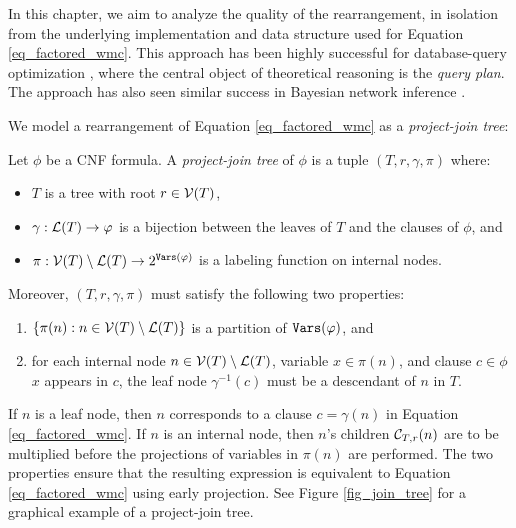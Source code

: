 In this chapter, we aim to analyze the quality of the rearrangement, in isolation from the underlying implementation and data structure used for Equation \eqref{eq_factored_wmc}.
This approach has been highly successful for database-query optimization \cite{MPPV04}, where the central object of theoretical reasoning is the \emph{query plan}.
The approach has also seen similar success in Bayesian network inference \cite{darwiche1998dynamic}.

We model a rearrangement of Equation \eqref{eq_factored_wmc} as a \emph{project-join tree}:
\begin{definition}
\label{def_jointree}
    Let $\phi$ be a CNF formula.
    A \emph{project-join tree} of $\phi$ is a tuple $(T, r, \gamma, \pi)$ where:
    \begin{itemize}
        \item $T$ is a tree with root $r \in \mathcal{V}(T)$,
        \item $\gamma: \mathcal{L}(T) \to \varphi$ is a bijection between the leaves of $T$ and the clauses of $\phi$, and
        \item $\pi: \mathcal{V}(T) \setminus \mathcal{L}(T) \to 2^{\texttt{\upshape Vars}(\varphi)}$ is a labeling function on internal nodes.
    \end{itemize}
    Moreover, $(T, r, \gamma, \pi)$ must satisfy the following two properties:
    \begin{enumerate}[ref=\arabic*]
        \item $\{\pi(n) : n \in \mathcal{V}(T) \setminus \mathcal{L}(T) \}$ is a partition of $\texttt{\upshape Vars}(\varphi)$, and \label{prop1}
        \item for each internal node $n \in \mathcal{V}(T) \setminus \mathcal{L}(T)$, variable $x \in \pi(n)$, and clause $c \in \phi$ \st{} $x$ appears in $c$, the leaf node $\gamma^{-1}(c)$ must be a descendant of $n$ in $T$. \label{prop2}
    \end{enumerate}
\end{definition}
If $n$ is a leaf node, then $n$ corresponds to a clause $c = \gamma(n)$ in Equation \eqref{eq_factored_wmc}.
If $n$ is an internal node, then $n$'s children $\mathcal{C}_{T,r}(n)$ are to be multiplied before the projections of variables in $\pi(n)$ are performed.
The two properties ensure that the resulting expression is equivalent to Equation \eqref{eq_factored_wmc} using early projection.
See Figure \ref{fig_join_tree} for a graphical example of a project-join tree.
